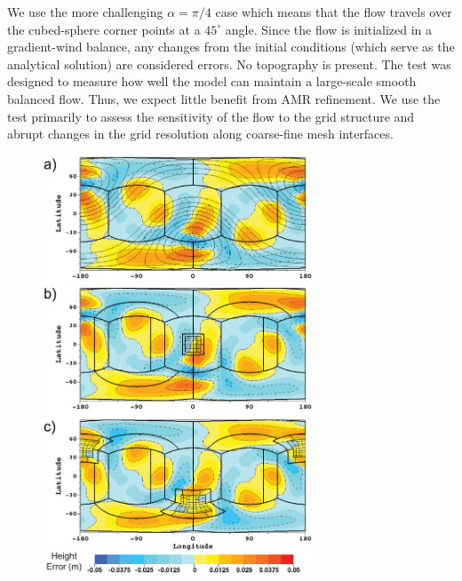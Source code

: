 We use the more challenging $\alpha = \pi / 4$
case which means that the flow travels over the
cubed-sphere corner points at a $45^\circ$ angle.  Since the flow is
initialized in a gradient-wind balance, any changes from the initial conditions 
(which serve as the analytical solution) are considered 
errors. No topography is present. The test was designed to measure how well the model
can maintain a large-scale smooth balanced flow.  Thus, we expect little
benefit from AMR refinement.  We use the test primarily to assess the
sensitivity of the flow to the grid structure and abrupt changes in the
grid resolution along coarse-fine mesh interfaces.
%
\begin{figure}
    \centerline{%
    \noindent
    \includegraphics[width=19pc]{Chap1/test2_herrormeter_c32_day5.eps}}

\end{figure}
